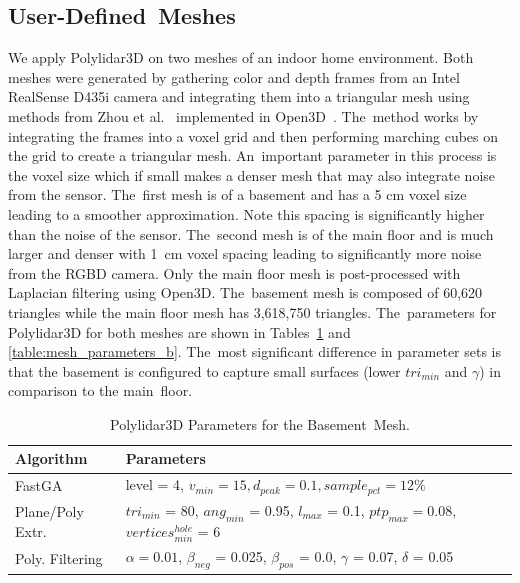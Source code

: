 \subsection{User-Defined~Meshes}\label{sec:ch3_results_meshes_parallel}

We apply Polylidar3D on two meshes of an indoor home environment.  Both meshes were generated by gathering color and depth frames from an Intel RealSense D435i camera and integrating them into a triangular mesh using methods from Zhou et al.~\cite{zhou_dense_2013}  implemented in Open3D~\cite{zhou_open3d_2018}. The~method works by integrating the frames into a voxel grid and then performing marching cubes on the grid to create a triangular mesh. An~important parameter in this process is the voxel size which if small makes a denser mesh that may also integrate noise from the sensor. The~first mesh is of a basement and has a 5 cm voxel size leading to a smoother approximation. Note this spacing is significantly higher than the noise of the sensor. The~second mesh is of the main floor and is much larger and denser with 1~cm voxel spacing leading to significantly more noise from the RGBD camera. Only the main floor mesh is post-processed with Laplacian filtering using Open3D. The~basement mesh is composed of 60,620 triangles while the main floor mesh has 3,618,750 triangles. The~parameters for Polylidar3D for both meshes are shown in Tables~\ref{table:mesh_parameters_a} and \ref{table:mesh_parameters_b}. The~most significant difference in parameter sets is that the basement is configured to capture small surfaces (lower $tri_{min}$ and $\gamma$) in comparison to the main~floor.

\begin{table}[H]
\centering
\caption{Polylidar3D Parameters for the Basement~Mesh.}\label{table:mesh_parameters_a}
\begin{tabular}{@{}ll@{}}
\toprule
\textbf{Algorithm}        & \textbf{Parameters}                                                          \\ \midrule
FastGA           & level = 4,  $v_{min} = 15, d_{peak} = 0.1, sample_{pct} = 12\%$            \\
Plane/Poly Extr.      & $tri_{min}$ = 80, $ang_{min}$ = 0.95, $l_{max}$ = 0.1, $ptp_{max} = 0.08$, $vertices^{hole}_{min}$ = 6     \\
Poly. Filtering      & $\alpha = 0.01$, $\beta_{neg}$ = 0.025, $\beta_{pos}$ = 0.0, $\gamma$ = 0.07, $\delta$ = 0.05     \\ \bottomrule
\end{tabular}
\end{table}
\unskip

